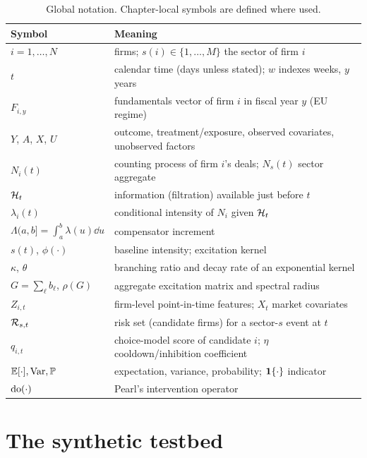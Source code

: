 \begin{table}[htbp]
\centering
\small
\begin{tabular}{ll}
\toprule
Symbol & Meaning \\
\midrule
$i = 1,\dots,N$ & firms; $s(i) \in \{1,\dots,M\}$ the sector of firm $i$ \\
$t$ & calendar time (days unless stated); $w$ indexes weeks, $y$ years \\
$F_{i,y}$ & fundamentals vector of firm $i$ in fiscal year $y$ (EU regime) \\
$Y$, $A$, $X$, $U$ & outcome, treatment/exposure, observed covariates, unobserved factors \\
$N_i(t)$ & counting process of firm $i$'s deals; $N_s(t)$ sector aggregate \\
$\mathcal{H}_t$ & information (filtration) available just before $t$ \\
$\lambda_i(t)$ & conditional intensity of $N_i$ given $\mathcal{H}_t$ \\
$\Lambda(a,b] = \int_a^b \lambda(u)\dd u$ & compensator increment \\
$s(t)$, $\phi(\cdot)$ & baseline intensity; excitation kernel \\
$\kappa$, $\theta$ & branching ratio and decay rate of an exponential kernel \\
$G = \sum_\ell b_\ell$, $\rho(G)$ & aggregate excitation matrix and spectral radius \\
$Z_{i,t}$ & firm-level point-in-time features; $X_t$ market covariates \\
$\mathcal{R}_{s,t}$ & risk set (candidate firms) for a sector-$s$ event at $t$ \\
$q_{i,t}$ & choice-model score of candidate $i$; $\eta$ cooldown/inhibition coefficient \\
$\mathbb{E}[\cdot], \mathrm{Var}, \mathbb{P}$ & expectation, variance, probability; $\mathbf{1}\{\cdot\}$ indicator \\
$\mathrm{do}(\cdot)$ & Pearl's intervention operator \\
\bottomrule
\end{tabular}
\caption{Global notation. Chapter-local symbols are defined where used.}
\label{tab:notation}
\end{table}

\section{The synthetic testbed}
\label{sec:testbed}

